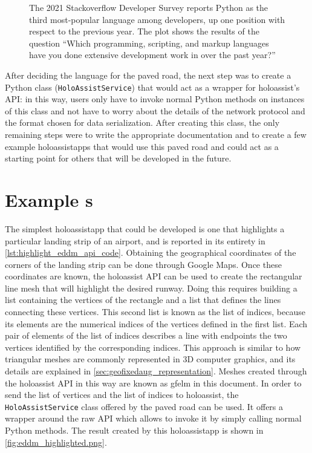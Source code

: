 \begin{figure}
  \centering
  
  \caption{The 2021 Stackoverflow Developer Survey\cite{noauthor_stack_nodate} reports Python as the third most-popular language among developers, up one position with respect to the previous year. The plot shows the results of the question \enquote{Which programming, scripting, and markup languages have you done extensive development work in over the past year?}}\label{fig:stack_overflow_developer_survey.png}
\end{figure}

After deciding the language for the paved road, the next step was to create a Python class (\texttt{HoloAssistService}) that would act as a wrapper for \gls{holoassist}'s \gls{API}: in this way, users only have to invoke normal Python methods on instances of this class and not have to worry about the details of the network protocol and the format chosen for data serialization. After creating this class, the only remaining steps were to write the appropriate documentation and to create a few example \glspl{holoassistapp} that would use this paved road and could act as a starting point for others that will be developed in the future.

\section{Example s}\label{sec:example_holoassistapps}

The simplest \gls{holoassistapp} that could be developed is one that highlights a particular landing strip of an airport, and is reported in its entirety in \autoref{lst:highlight_eddm_api_code}. Obtaining the geographical coordinates of the corners of the landing strip can be done through Google Maps. Once these coordinates are known, the \gls{holoassist} \gls{API} can be used to create the rectangular line mesh that will highlight the desired runway. Doing this requires building a list containing the vertices of the rectangle and a list that defines the lines connecting these vertices. This second list is known as the list of indices, because its elements are the numerical indices of the vertices defined in the first list. Each pair of elements of the list of indices describes a line with endpoints the two vertices identified by the corresponding indices. This approach is similar to how triangular meshes are commonly represented in 3D computer graphics, and its details are explained in \autoref{sec:geofixedaug_representation}. Meshes created through the \gls{holoassist} \gls{API} in this way are known as \gls{gfelm} in this document. In order to send the list of vertices and the list of indices to \gls{holoassist}, the \texttt{HoloAssistService} class offered by the paved road can be used. It offers a wrapper around the raw \gls{API} which allows to invoke it by simply calling normal Python methods. The result created by this \gls{holoassistapp} is shown in \autoref{fig:eddm_highlighted.png}.

